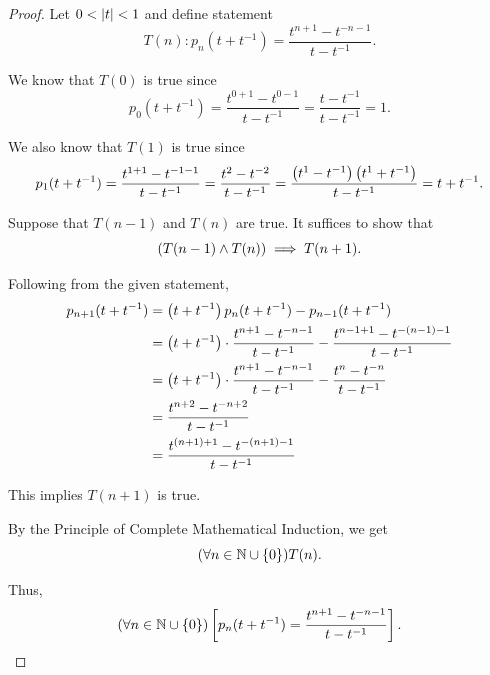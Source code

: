 \newpage

\subsubsection{}
\begin{proof}
    Let $0 < \left|t\right| < 1$ and define statement 
    \begin{equation*}
        T(n): p_n(t + t^{-1}) = \frac{t^{n + 1} - t^{-n-1}}{t - t^{-1}}. 
    \end{equation*}

    We know that $T(0)$ is true since 
    \begin{equation*}
        p_0(t + t^{-1}) = \frac{t^{0 + 1} - t^{0 - 1}}{t - t^{-1}} = \frac{t - t^{-1}}{t - t^{-1}} = 1.  
    \end{equation*}

    We also know that $T(1)$ is true since 
    \begin{equation*}
        p_1(t + t^{-1}) = \frac{t^{1 + 1} - t^{-1 - 1}}{t - t^{-1}} = \frac{t^2 - t^{-2}}{t - t^{-1}} = \frac{\left(t^1 - t^{-1}\right) \left(t^1 + t^{-1}\right)}{t - t^{-1}} =  t + t^{-1}.  
    \end{equation*}

    Suppose that $T(n - 1)$ and $T(n)$ are true. 
    It suffices to show that 
    \begin{equation*}
        \left(T(n - 1) \wedge T(n)\right) \implies T(n + 1). 
    \end{equation*}

    Following from the given statement, 
    \begin{align*}
        p_{n + 1}(t + t^{-1}) &= \left(t + t^{-1}\right) p_n(t + t^{-1}) - p_{n - 1}(t + t^{-1}) \\
        &= \left(t + t^{-1}\right) \cdot  \frac{t^{n + 1} - t^{-n - 1}}{t - t^{-1}} - \frac{t^{n - 1 + 1} - t^{-(n - 1) - 1}}{t - t^{-1}} \\
        &= \left(t + t^{-1}\right) \cdot  \frac{t^{n + 1} - t^{-n - 1}}{t - t^{-1}} - \frac{t^{n} - t^{-n}}{t - t^{-1}} \\
        &= \frac{t^{n + 2} - t^{-n + 2}}{t - t^{-1}} \\
        &= \frac{t^{(n + 1) + 1} - t^{-(n + 1) - 1}}{t - t^{-1}}
    \end{align*}

    This implies $T(n + 1)$ is true. 

    By the Principle of Complete Mathematical Induction, we get 
    \begin{equation*}
        (\forall n \in \mathbb{N}\cup\left\{0\right\})T(n). 
    \end{equation*}

    Thus, 
    \begin{equation*}
        (\forall n \in \mathbb{N}\cup\left\{0\right\})\left[p_n(t + t^{-1}) = \frac{t^{n + 1} - t^{-n-1}}{t - t^{-1}}\right].
    \end{equation*}
\end{proof}

